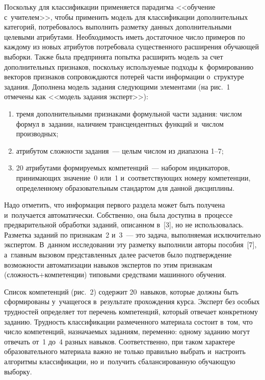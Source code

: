 \begin{multicols}{2}
      Поскольку для классификации применяется парадигма <<обучение 
с~учителем>>, чтобы применить модель для классификации дополнительных 
категорий, потребовалось выполнить разметку данных дополнительными 
целевыми атрибутами. Необходимость иметь достаточное чис\-ло примеров по 
каж\-до\-му из новых атрибутов потребовала существенного расширения 
обуча\-ющей выборки. Так\-же была предпринята попытка расширить модель за 
счет дополнительных признаков, по\-сколь\-ку ис\-поль\-зу\-емые подходы 
к~формированию векторов при\-зна\-ков со\-про\-вож\-да\-ют\-ся потерей час\-ти 
информации о~структуре задания. Дополнена модель задания сле\-ду\-ющи\-ми 
элементами (на рис.~1 отмечены как <<модель задания эксперт>>):
\begin{enumerate}[(1)]
\item тремя дополнительными признаками формульной части задания: 
числом формул в~задании, наличием трансцендентных функций и~числом 
производных;
\item атрибутом сложности задания~--- целым чис\-лом из диапазона 1--7;
\item 20 атрибутами формируемых компетенций~--- набором индикаторов, 
принимающих значение~0 или~1 и~соответствующих номеру компетенции, 
определенному образовательным стандартом для данной дисциплины.
\end{enumerate}

      Надо отметить, что информация первого раздела может быть 
получена и~получается автоматически. Собственно, она была доступна в~процессе предварительной обработки заданий, \mbox{описанном} в~[3], но не 
использовалась. Разметка заданий по признакам~2 и~3~--- это задача, 
выполняемая исключительно экспертом. В~данном исследовании эту 
разметку выполнили авторы пособия~[7], а~главным вызовом 
представленных далее расчетов было подтверждение возможности 
автоматизации навыков экспертов по этим признакам  
(слож\-ность\;+\;ком\-пе\-тен\-ции) типовыми средствами \mbox{машинного}  
обуче\-ния.
      


      Список компетенций (рис.~2) содержит 20~навыков, которые должны 
быть сформированы у~учащегося в~результате прохождения курса. Эксперт 
без особых трудностей определяет тот перечень компетенций, который 
отвечает конкретному заданию. Трудность классификации размеченного 
материала состоит в~том, что чис\-ло компетенций, на\-зна\-ча\-емых заданиям, 
переменно: одному заданию могут отвечать от~1 до~4 раз\-ных навыков. 
Соответственно, при таком характере образовательного материала важно не 
только правильно выбрать и~на\-стро\-ить алгоритмы классификации, но 
и~получить сбалансированную обуча\-ющую выборку.
      



\end{multicols}
